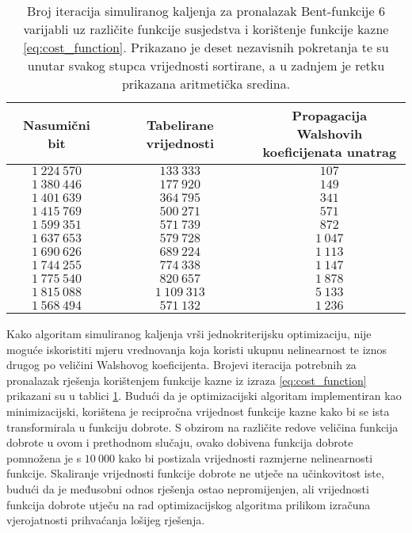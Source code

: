 \begin{table}[]
    \centering
    \captionsetup{justification=centering}
    \caption{Broj iteracija simuliranog kaljenja za pronalazak Bent-funkcije $6$ varijabli uz različite funkcije susjedstva i korištenje funkcije kazne \eqref{eq:cost_function}. Prikazano je deset nezavisnih pokretanja te su unutar svakog stupca vrijednosti sortirane, a u zadnjem je retku prikazana aritmetička sredina.}
    \begin{tabular}{ccc} \hline
        Nasumični bit & Tabelirane vrijednosti & \makecell{Propagacija Walshovih \\ koeficijenata unatrag} \\ \hline
        $1\:224\:570$ &    $133\:333$ &    $107$ \\
        $1\:380\:446$ &    $177\:920$ &    $149$ \\
        $1\:401\:639$ &    $364\:795$ &    $341$ \\
        $1\:415\:769$ &    $500\:271$ &    $571$ \\
        $1\:599\:351$ &    $571\:739$ &    $872$ \\
        $1\:637\:653$ &    $579\:728$ & $1\:047$ \\
        $1\:690\:626$ &    $689\:224$ & $1\:113$ \\
        $1\:744\:255$ &    $774\:338$ & $1\:147$ \\
        $1\:775\:540$ &    $820\:657$ & $1\:878$ \\
        $1\:815\:088$ & $1\:109\:313$ & $5\:133$ \\ \hline
        $1\:568\:494$ &    $571\:132$ & $1\:236$
    \end{tabular}
    \label{tbl:simaneal_6_walshe}
\end{table}
Kako algoritam simuliranog kaljenja vrši jednokriterijsku optimizaciju, nije moguće iskoristiti mjeru vrednovanja koja koristi ukupnu nelinearnost te iznos drugog po veličini Walshovog koeficijenta.
Brojevi iteracija potrebnih za pronalazak rješenja korištenjem funkcije kazne iz izraza \eqref{eq:cost_function} prikazani su u tablici \ref{tbl:simaneal_6_walshe}.
Budući da je optimizacijski algoritam implementiran kao minimizacijski, korištena je recipročna vrijednost funkcije kazne kako bi se ista transformirala u funkciju dobrote.
S obzirom na različite redove veličina funkcija dobrote u ovom i prethodnom slučaju, ovako dobivena funkcija dobrote pomnožena je s $10\:000$ kako bi postizala vrijednosti razmjerne nelinearnosti funkcije.
Skaliranje vrijednosti funkcije dobrote ne utječe na učinkovitost iste, budući da je međusobni odnos rješenja ostao nepromijenjen, ali vrijednosti funkcija dobrote utječu na rad optimizacijskog algoritma prilikom izračuna vjerojatnosti prihvaćanja lošijeg rješenja.

